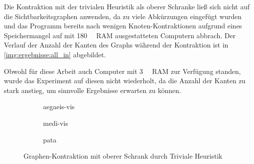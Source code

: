 Die Kontraktion mit der trivialen Heuristik als oberer Schranke ließ sich nicht auf die Sichtbarkeitsgraphen anwenden, da zu viele Abkürzungen eingefügt wurden und das Programm bereits nach wenigen Knoten-Kontraktionen aufgrund eines Speichermangel auf mit \SI{180}{\giga\byte} RAM ausgestatteten Computern abbrach.
Der Verlauf der Anzahl der Kanten des Graphs während der Kontraktion ist in \autoref{img:ergebnisse:all_in} abgebildet.

Obwohl für diese Arbeit auch Computer mit \SI{3}{\tera\byte} RAM  zur Verfügung standen, wurde das Experiment auf diesen nicht wiederholt, da die Anzahl der Kanten zu stark anstieg, um sinnvolle Ergebnisse erwarten zu können.

\begin{figure}[p]%
  \begin{subfigure}[b]{0.5\textwidth}
    \caption{aegaeis-vis}%
  \end{subfigure}%
  \begin{subfigure}[b]{0.5\textwidth}%
    \caption{medi-vis}%
  \end{subfigure}%
  \par%
  \begin{subfigure}[b]{0.5\textwidth}%
    \caption{pata}
  \end{subfigure}
  \caption{Graphen-Kontraktion mit oberer Schrank durch Triviale Heuristik}
  \label{img:ergebnisse:all_in}
\end{figure}

